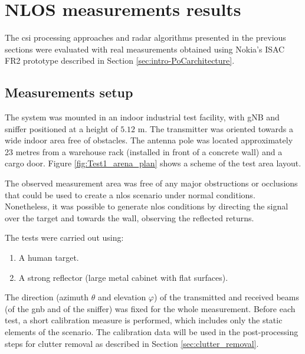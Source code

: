 \chapter{NLOS measurements results}

The \gls{csi} processing approaches and radar algorithms presented in the previous sections were evaluated with real measurements obtained using Nokia's ISAC FR2 prototype described in Section \ref{sec:intro-PoCarchitecture}.

\section{Measurements setup}
\label{sec:Test1_meas_scenario}

The system was mounted in an indoor industrial test facility, with gNB and sniffer positioned at a height of $5.12$ m. The transmitter was oriented towards a wide  indoor area free of obstacles. The antenna pole was located approximately 23 metres from a warehouse rack (installed in front of a concrete wall) and a cargo door.
Figure \ref{fig:Test1_arena_plan} shows a scheme of the test area layout.

The observed measurement area was free of any major obstructions or occlusions that could be used to create a \gls{nlos} scenario under normal conditions.
Nonetheless, it was possible to generate \gls{nlos} conditions by directing the signal over the target and towards the wall, observing the reflected returns.

 
The tests were carried out using:

\begin{enumerate}
	\item A human target.
	\item A strong reflector (large metal cabinet with flat surfaces).
\end{enumerate}

The direction (azimuth $\theta$ and elevation $\varphi$) of the transmitted and received beams (\ie of the \gls{gnb} and of the sniffer) was fixed for the whole measurement.
Before each test, a short calibration measure is performed, which includes only the static elements of the scenario. The calibration data will be used in the post-processing steps for clutter removal as described in Section \ref{sec:clutter_removal}.

